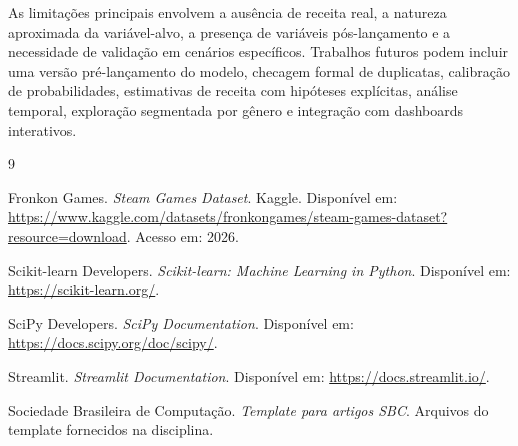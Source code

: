 \documentclass[12pt]{article}
\begin{document}
As limitações principais envolvem a ausência de receita real, a natureza aproximada da variável-alvo, a presença de variáveis pós-lançamento e a necessidade de validação em cenários específicos. Trabalhos futuros podem incluir uma versão pré-lançamento do modelo, checagem formal de duplicatas, calibração de probabilidades, estimativas de receita com hipóteses explícitas, análise temporal, exploração segmentada por gênero e integração com dashboards interativos.

\begin{thebibliography}{9}

Fronkon Games. \textit{Steam Games Dataset}. Kaggle. Disponível em: \url{https://www.kaggle.com/datasets/fronkongames/steam-games-dataset?resource=download}. Acesso em: 2026.

Scikit-learn Developers. \textit{Scikit-learn: Machine Learning in Python}. Disponível em: \url{https://scikit-learn.org/}.

SciPy Developers. \textit{SciPy Documentation}. Disponível em: \url{https://docs.scipy.org/doc/scipy/}.

Streamlit. \textit{Streamlit Documentation}. Disponível em: \url{https://docs.streamlit.io/}.

Sociedade Brasileira de Computação. \textit{Template para artigos SBC}. Arquivos do template fornecidos na disciplina.

\end{thebibliography}
\end{document}
